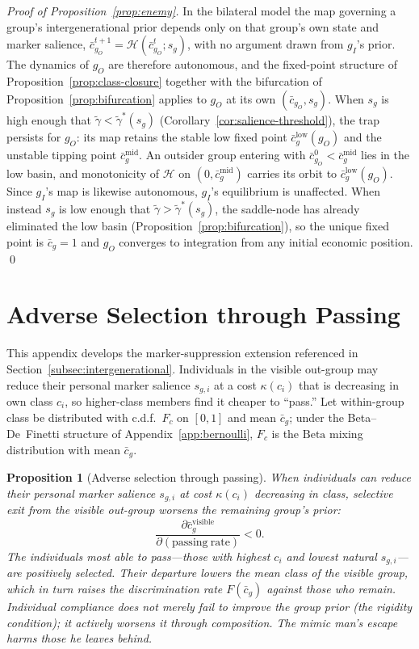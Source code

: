 \documentclass[pdflatex,sn-basic]{sn-jnl}
\theoremstyle{thmstyleone}
\newtheorem{proposition}{Proposition}
\numberwithin{proposition}{subsection}
\begin{document}
\begin{proof}[Proof of Proposition~\ref{prop:enemy}]
In the bilateral model the map governing a group's intergenerational
prior depends only on that group's own state and marker salience,
$\bar{c}_{g_O}^{t+1} = \mathcal{H}(\bar{c}_{g_O}^t; s_g)$, with no argument
drawn from $g_I$'s prior. The dynamics of $g_O$ are therefore
autonomous, and the fixed-point structure of
Proposition~\ref{prop:class-closure} together with the bifurcation of
Proposition~\ref{prop:bifurcation} applies to $g_O$ at its own
$(\bar{c}_{g_O}, s_g)$. When $s_g$ is high enough that
$\tilde{\gamma} < \tilde{\gamma}^*(s_g)$
(Corollary~\ref{cor:salience-threshold}), the trap persists for $g_O$:
its map retains the stable low fixed point
$\bar{c}_g^{\mathrm{low}}(g_O)$ and the unstable tipping point
$\bar{c}_g^{\mathrm{mid}}$. An outsider group entering with
$\bar{c}_{g_O}^0 < \bar{c}_g^{\mathrm{mid}}$ lies in the low basin, and
monotonicity of $\mathcal{H}$ on $(0, \bar{c}_g^{\mathrm{mid}})$ carries its
orbit to $\bar{c}_g^{\mathrm{low}}(g_O)$. Since $g_I$'s map is likewise
autonomous, $g_I$'s equilibrium is unaffected. When instead $s_g$ is
low enough that $\tilde{\gamma} > \tilde{\gamma}^*(s_g)$, the saddle-node
has already eliminated the low basin
(Proposition~\ref{prop:bifurcation}), so the unique fixed point is
$\bar{c}_g = 1$ and $g_O$ converges to integration from any initial
economic position. \qed
\end{proof}

\section{Adverse Selection through Passing}
\label{app:passing}

This appendix develops the marker-suppression extension referenced in
Section~\ref{subsec:intergenerational}. Individuals in the visible
out-group may reduce their personal marker salience $s_{g,i}$ at a cost
$\kappa(c_i)$ that is decreasing in own class $c_i$, so higher-class
members find it cheaper to ``pass.'' Let within-group class be
distributed with c.d.f.\ $F_c$ on $[0,1]$ and mean $\bar{c}_g$; under the
Beta--De~Finetti structure of Appendix~\ref{app:bernoulli}, $F_c$ is the
$\mathrm{Beta}$ mixing distribution with mean $\bar{c}_g$.

\begin{proposition}[Adverse selection through passing]
\label{prop:passing}
When individuals can reduce their personal marker salience $s_{g,i}$
at cost $\kappa(c_i)$ decreasing in class, selective exit from the
visible out-group worsens the remaining group's prior:
\[
  \frac{\partial \bar{c}_g^{\mathrm{visible}}}
  {\partial (\mathrm{passing\ rate})} < 0.
\]
The individuals most able to pass---those with highest $c_i$ and
lowest natural $s_{g,i}$---are positively selected. Their departure
lowers the mean class of the visible group, which in turn raises the
discrimination rate $F(\bar{c}_g)$ against those who remain. Individual
compliance does not merely fail to improve the group prior (the
rigidity condition); it actively worsens it through composition. The
mimic man's escape harms those he leaves behind.
\end{proposition}
\end{document}
